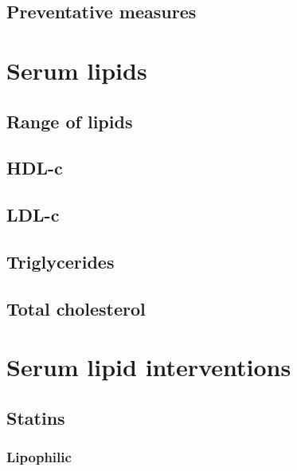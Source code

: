 \documentclass[a4paper, twoside]{templates/ociamthesis}
\begin{document}
\hypertarget{preventative-measures}{%
\subsection{Preventative measures}\label{preventative-measures}}

\hypertarget{serum-lipids}{%
\section{Serum lipids}\label{serum-lipids}}

\hypertarget{range-of-lipids}{%
\subsection{Range of lipids}\label{range-of-lipids}}

\hypertarget{hdl-c}{%
\subsection{HDL-c}\label{hdl-c}}

\hypertarget{ldl-c}{%
\subsection{LDL-c}\label{ldl-c}}

\hypertarget{triglycerides}{%
\subsection{Triglycerides}\label{triglycerides}}

\hypertarget{total-cholesterol}{%
\subsection{Total cholesterol}\label{total-cholesterol}}

\hypertarget{serum-lipid-interventions}{%
\section{Serum lipid interventions}\label{serum-lipid-interventions}}

\hypertarget{statins}{%
\subsection{Statins}\label{statins}}

\hypertarget{lipophilic}{%
\subsubsection{Lipophilic}\label{lipophilic}}
\end{document}
